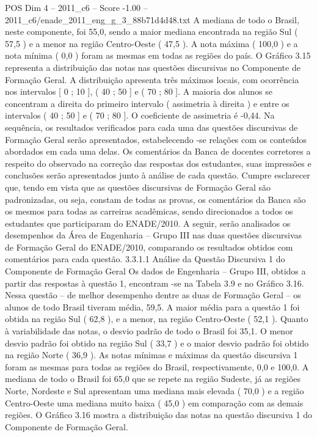 \begin{textsample}{POS Dim 4 – 2011\_c6 – Score -1.00 – 2011\_c6/enade\_2011\_eng\_g\_3\_88b71d4d48.txt}
A mediana de todo o Brasil, neste componente, foi 55,0, sendo a maior mediana encontrada na região Sul ( 57,5 ) e a menor na região Centro-Oeste ( 47,5 ).
A nota máxima ( 100,0 ) e a nota mínima ( 0,0 ) foram as mesmas em todas as regiões do país.
O Gráfico 3.15 representa a distribuição das notas nas questões discursivas no Componente de Formação Geral.
A distribuição apresenta três máximos locais, com ocorrência nos intervalos [ 0 ; 10 ], ( 40 ; 50 ] e ( 70 ; 80 ].
A maioria dos alunos se concentram a direita do primeiro intervalo ( assimetria à direita ) e entre os intervalos ( 40 ; 50 ] e ( 70 ; 80 ].
O coeficiente de assimetria é -0,44.
Na sequência, os resultados verificados para cada uma das questões discursivas de Formação Geral serão apresentados, estabelecendo -se relações com os conteúdos abordados em cada uma delas.
Os comentários da Banca de docentes corretores a respeito do observado na correção das respostas dos estudantes, suas impressões e conclusões serão apresentados junto à análise de cada questão.
Cumpre esclarecer que, tendo em vista que as questões discursivas de Formação Geral são padronizadas, ou seja, constam de todas as provas, os comentários da Banca são os mesmos para todas as carreiras acadêmicas, sendo direcionados a todos os estudantes que participaram do ENADE/2010.
A seguir, serão analisados os desempenhos da Área de Engenharia – Grupo III nas duas questões discursivas de Formação Geral do ENADE/2010, comparando os resultados obtidos com comentários para cada questão. 3.3.1.1 Análise da Questão Discursiva 1 do Componente de Formação Geral Os dados de Engenharia – Grupo III, obtidos a partir das respostas à questão 1, encontram -se na Tabela 3.9 e no Gráfico 3.16.
Nessa questão – de melhor desempenho dentre as duas de Formação Geral – os alunos de todo Brasil tiveram média, 59,5.
A maior média para a questão 1 foi obtida na região Sul ( 62,8 ), e a menor, na região Centro-Oeste ( 52,1 ).
Quanto à variabilidade das notas, o desvio padrão de todo o Brasil foi 35,1.
O menor desvio padrão foi obtido na região Sul ( 33,7 ) e o maior desvio padrão foi obtido na região Norte ( 36,9 ).
As notas mínimas e máximas da questão discursiva 1 foram as mesmas para todas as regiões do Brasil, respectivamente, 0,0 e 100,0.
A mediana de todo o Brasil foi 65,0 que se repete na região Sudeste, já as regiões Norte, Nordeste e Sul apresentam uma mediana mais elevada ( 70,0 ) e a região Centro-Oeste uma mediana muito baixa ( 45,0 ) em comparação com as demais regiões.
O Gráfico 3.16 mostra a distribuição das notas na questão discursiva 1 do Componente de Formação Geral.

\end{textsample}

